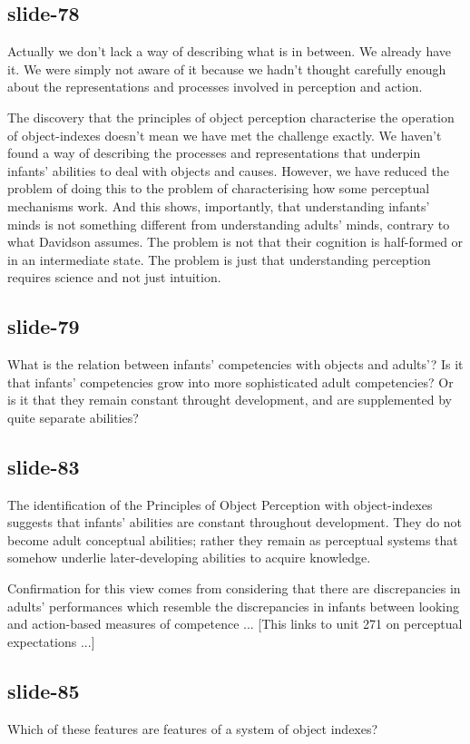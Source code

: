 \documentclass[12pt,\papersize]{extarticle}
\begin{document}
\subsection{slide-78}
Actually we don’t lack a way of describing what is in between.
We already have it.
We were simply not aware of it because we hadn’t thought carefully enough
about the representations and processes involved in perception and action.

The discovery that the principles of object perception characterise the operation of
object-indexes doesn't mean we have met the challenge exactly.
We haven't found a way of describing the processes and representations that underpin infants'
abilities to deal with objects and causes.
However, we have reduced the problem of doing this to the problem of characterising how
some perceptual mechanisms work.
And this shows, importantly, that understanding infants' minds is not something different from
understanding adults' minds, contrary to what Davidson assumes.
The problem is not that their cognition is half-formed or in an intermediate state.
The problem is just that understanding perception requires science and not just intuition.

\subsection{slide-79}
What is the relation between infants' competencies with objects and adults'?
Is it that infants' competencies grow into more sophisticated adult competencies?
Or is it that they remain constant throught development, and are supplemented by quite
separate abilities?

\subsection{slide-83}
The identification of the Principles of Object Perception with object-indexes suggests that
infants' abilities are constant throughout development.
They do not become adult conceptual abilities; rather they remain as perceptual systems
that somehow underlie later-developing abilities to acquire knowledge.

Confirmation for this view comes from considering that there are discrepancies in adults'
performances which resemble the discrepancies in infants between looking and action-based
measures of competence ...
[This links to unit 271 on perceptual expectations ...]

\subsection{slide-85}
Which of these features are features of a system of object indexes?
\end{document}
